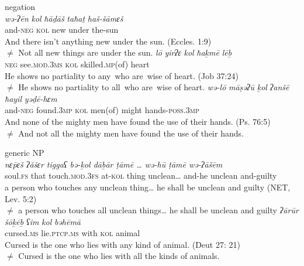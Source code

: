 \documentclass[output=paper]{langsci/langscibook}
\begin{document}
 \ea
 negation\label{ex:doron:37}\\
 \ea
 \gll \textit{wə-ʔēn}     \textit{kol}   \textit{ħāḏāš}  \textit{taħaṯ}  \textit{haš-šāmɛš}\\
      and-\textsc{neg}  \textsc{kol} new     under the-sun\\
 \glt And there isn’t anything new under the sun. (Eccles. 1:9)\\${\neq}$  Not all new things are under the sun.
 \ex
 \gll \textit{lō}      \textit{yirʔɛ}                \textit{kol}   \textit{ħaḵmē}              \textit{lēḇ}  \\
      \textsc{neg}  see.\textsc{mod.3ms}   \textsc{kol} skilled\textsc{.mp}(of)  heart\\
 \glt He shows no partiality to any~who are~wise of heart. (Job 37:24)\\${\neq}$  He shows no partiality to all~who are~wise of heart.
 \ex
 \gll \textit{wə-lō}       \textit{māṣəʔū}      \textit{ḵol}   \textit{ʔanšē}     \textit{ħayil}    \textit{yəḏē-hɛm}\\
      and-\textsc{neg} found.\textsc{3mp}  \textsc{kol} men(of) might  hands{}-\textsc{poss.3mp}\\
 \glt And none of the mighty men have found the use of their hands. (Ps. 76:5)\\${\neq}$  And not all the mighty men have found the use of their hands.
 \z
\z



\ea%
    generic NP\label{ex:doron:38}\\
    \ea
    \gll \textit{nɛ\={p}ɛš      ʔăšɛr tiggaʕ                bə-ḵol  dāḇār  ṭāmē …     wə-hū    ṭāmē      wə-ʔāšēm}\\
         soul.\textsc{fs}   that   touch.\textsc{mod.3fs}  at-\textsc{kol} thing  unclean… and-he   unclean and-guilty\\
    \glt a person who touches any unclean thing… he shall be unclean and guilty (NET, Lev. 5:2)\\${\neq}$   a person who touches all unclean things… he shall be unclean and guilty
    \ex
    \gll \textit{ʔārūr}          \textit{šōḵēḇ}          \textit{ʕim}   \textit{kol}   \textit{bəhēmā}\\
         cursed.\textsc{ms}  lie.\textsc{ptcp.ms}  with \textsc{kol} animal\\
    \glt Cursed is the one who lies with any kind of animal. (Deut 27: 21)\\${\neq}$  Cursed is the one who lies with all the kinds of animals.
    \z
\z
\end{document}
